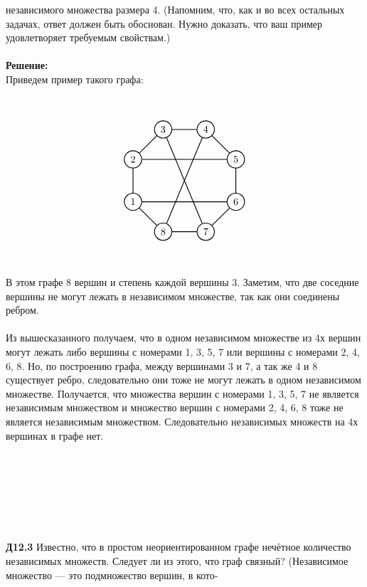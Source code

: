 \documentclass[a4paper, 12pt]{article}
\begin{document}
    независимого множества размера 4. (Напомним, что, как и во всех остальных задачах, ответ должен
    быть обоснован. Нужно доказать, что ваш пример удовлетворяет требуемым свойствам.)
    \\
    \\ \textbf{Решение: }
    \\ Приведем пример такого графа:
    \\ \\ \\
    \[\begin{tikzpicture}[node distance={15mm}, thick, main/.style = {draw, circle}] 
        \node[main] (1) {$1$}; 
        \node[main] (2) [above of=1] {$2$}; 
        \node[main] (3) [above right of=2] {$3$}; 
        \node[main] (4) [right of=3] {$4$}; 
        \node[main] (5) [below right of=4] {$5$}; 
        \node[main] (6) [below of=5] {$6$}; 
        \node[main] (7) [below left of=6] {$7$}; 
        \node[main] (8) [left of=7] {$8$};
        \draw[-] (1) -- (2); 
        \draw[-] (2) -- (3);
        \draw[-] (3) -- (4);
        \draw[-] (4) -- (5);
        \draw[-] (5) -- (6);
        \draw[-] (6) -- (7);
        \draw[-] (7) -- (8);
        \draw[-] (1) -- (8);
        \draw[-] (7) -- (3);
        \draw[-] (4) -- (8);
        \draw[-] (2) -- (5);
        \draw[-] (1) -- (6);
      \end{tikzpicture}\]
    \\
    \\ В этом графе 8 вершин и степень каждой вершины 3. Заметим, что две соседние вершины не могут лежать в независимом множестве, так как они соединены ребром.
    \\
    \\ Из вышесказанного получаем, что в одном независимом множестве из 4х вершин могут лежать либо вершины с номерами 1, 3, 5, 7 или вершины с номерами 2, 4, 6, 8. Но, по построению графа, между вершинами 3 и 7, а так же 4 и 8 существует ребро, следовательно они тоже не могут лежать в одном независимом множестве. Получается, что множества вершин с номерами 1, 3, 5, 7 не является независимым множеством и множество вершин с номерами 2, 4, 6, 8 тоже не является независимым множеством. Следовательно независимых множеств на 4х вершинах в графе нет.
    \\
    \\ \\ \\ \\ \\ \\ \\ \textbf{Д12.3} Известно, что в простом неориентированном графе нечётное количество независимых множеств. Следует ли из этого, что граф связный? (Независимое множество — это подмножество вершин, в кото-
\end{document}
